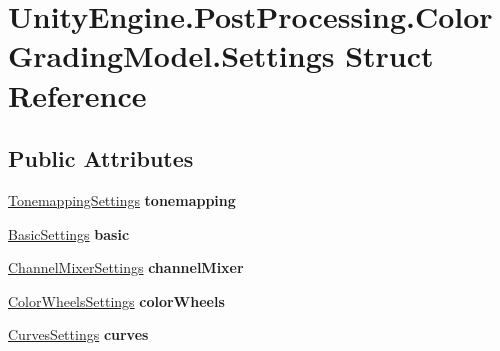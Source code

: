 \hypertarget{struct_unity_engine_1_1_post_processing_1_1_color_grading_model_1_1_settings}{}\section{Unity\+Engine.\+Post\+Processing.\+Color\+Grading\+Model.\+Settings Struct Reference}
\label{struct_unity_engine_1_1_post_processing_1_1_color_grading_model_1_1_settings}
\subsection*{Public Attributes}
\begin{DoxyCompactItemize}
\item 
\mbox{\label{struct_unity_engine_1_1_post_processing_1_1_color_grading_model_1_1_settings_a85039084a9a35443b7cb1cd44511dd36}} 
\hyperlink{struct_unity_engine_1_1_post_processing_1_1_color_grading_model_1_1_tonemapping_settings}{Tonemapping\+Settings} {\bfseries tonemapping}
\item 
\mbox{\label{struct_unity_engine_1_1_post_processing_1_1_color_grading_model_1_1_settings_a14f6045f035a0672774bcc2d487375f6}} 
\hyperlink{struct_unity_engine_1_1_post_processing_1_1_color_grading_model_1_1_basic_settings}{Basic\+Settings} {\bfseries basic}
\item 
\mbox{\label{struct_unity_engine_1_1_post_processing_1_1_color_grading_model_1_1_settings_a8f0f189e614ef9d08b9bfcda0918897d}} 
\hyperlink{struct_unity_engine_1_1_post_processing_1_1_color_grading_model_1_1_channel_mixer_settings}{Channel\+Mixer\+Settings} {\bfseries channel\+Mixer}
\item 
\mbox{\label{struct_unity_engine_1_1_post_processing_1_1_color_grading_model_1_1_settings_ae47ed3b838650ac6bb08560d34b7cd83}} 
\hyperlink{struct_unity_engine_1_1_post_processing_1_1_color_grading_model_1_1_color_wheels_settings}{Color\+Wheels\+Settings} {\bfseries color\+Wheels}
\item 
\mbox{\label{struct_unity_engine_1_1_post_processing_1_1_color_grading_model_1_1_settings_aa60424f37437ea8273e0bf5857176086}} 
\hyperlink{struct_unity_engine_1_1_post_processing_1_1_color_grading_model_1_1_curves_settings}{Curves\+Settings} {\bfseries curves}
\end{DoxyCompactItemize}
